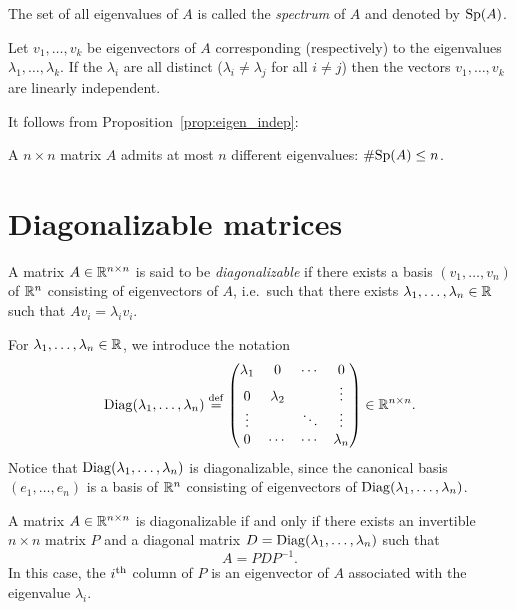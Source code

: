 \documentclass[11pt,nocut]{article}
\begin{document}
\begin{definition}
	The set of all eigenvalues of $A$ is called the \emph{spectrum} of $A$ and denoted by ${{\rm Sp}}(A)$.
\end{definition}

\begin{proposition}\label{prop:eigen_indep}
	Let $v_1, \dots, v_k$ be eigenvectors of $A$ corresponding (respectively) to the eigenvalues $\lambda_1, \dots, \lambda_k$.
	If the $\lambda_i$ are all distinct ($\lambda_i \neq \lambda_j$ for all $i \neq j$) then the vectors $v_1, \dots, v_k$ are linearly independent.
\end{proposition}

It follows from Proposition~\ref{prop:eigen_indep}:

\begin{corollary}
	A $n \times n$ matrix $A$ admits at most $n$ different eigenvalues: $\# {{\rm Sp}}(A) \leq n$.
\end{corollary}

\section{Diagonalizable matrices}

\begin{definition}
	A matrix $A \in \mathbb{R}^{n \times n}$ is said to be \emph{diagonalizable} if there exists a basis $(v_1, \dots, v_n)$ of $\mathbb{R}^n$ consisting of eigenvectors of $A$, i.e.\ such that there exists $\lambda_1, \dots, \lambda_n \in \mathbb{R}$ such that $Av_i = \lambda_i v_i$.
\end{definition}

For $\lambda_1, \dots, \lambda_n \in \mathbb{R}$, we introduce the notation
$$
{{\rm Diag}}(\lambda_1, \dots, \lambda_n) \overset{\rm def}{=}
\begin{pmatrix}
	\lambda_1 & 0 & \cdots & 0 \\
	0 & \lambda_2 & & \vdots \\
	\vdots & & \ddots & \vdots \\
	0 & \cdots &  \cdots & \lambda_n
\end{pmatrix} \in \mathbb{R}^{n\times n}.
$$
Notice that ${{\rm Diag}}(\lambda_1, \dots, \lambda_n)$ is diagonalizable, since the canonical basis $(e_1, \dots, e_n)$ is a basis of $\mathbb{R}^n$ consisting of eigenvectors of ${{\rm Diag}}(\lambda_1, \dots, \lambda_n)$.

\begin{proposition}\label{prop:diag}
	A matrix $A \in \mathbb{R}^{n \times n}$ is diagonalizable if and only if there exists an invertible $n \times n$ matrix $P$ and a diagonal matrix $D = {{\rm Diag}}(\lambda_1, \dots, \lambda_n)$ such that
	$$
	A = P D P^{-1}.
	$$
	In this case, the $i^{\rm th}$ column of $P$ is an eigenvector of $A$ associated with the eigenvalue $\lambda_i$.
\end{proposition}
\end{document}
